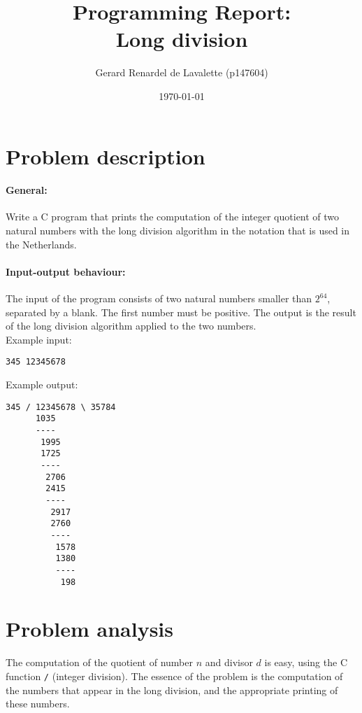 \documentclass[a4paper]{article}
\begin{document}
\title{Programming Report: \\
       Long division
}
\date{\today}
\author{Gerard Renardel de Lavalette (p147604)
}

\maketitle

\section{Problem description}

\paragraph{General:}
Write a C program that prints the computation of the integer quotient of two natural numbers with the long division algorithm in the notation that is used in the Netherlands.

\paragraph{Input-output behaviour:}
The input of the program consists of two natural numbers smaller than $2^{64}$, separated by a blank. 
The first number must be positive.
The output is the result of the long division algorithm applied to the two numbers.
\\
Example input:
\begin{verbatim}
345 12345678
\end{verbatim}
Example output:
\begin{verbatim}
345 / 12345678 \ 35784
      1035
      ----
       1995
       1725
       ----
        2706
        2415
        ----
         2917
         2760
         ----
          1578
          1380
          ----
           198
\end{verbatim}

\section{Problem analysis}

The computation of the quotient of number $n$ and divisor $d$ is easy, using the C function \verb!/! (integer division).
The essence of the problem is the computation of the numbers that appear in the long division, and the appropriate printing of these numbers.
\end{document}

